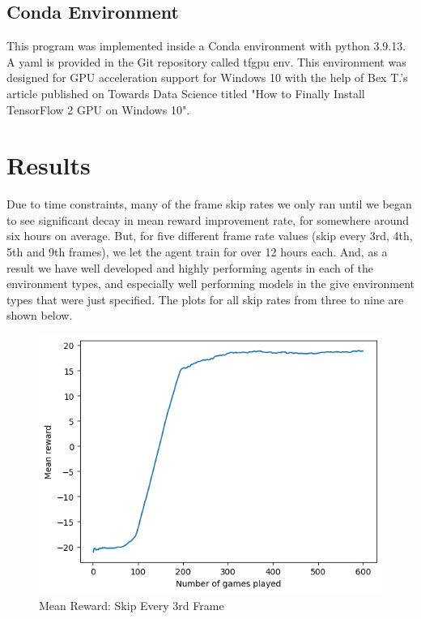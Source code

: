 \documentclass[12pt, a4paper, twocolumn]{article} %
\begin{document}
\subsection{Conda Environment}

This program was implemented inside a Conda environment with python 3.9.13. A yaml is provided in the Git repository called tfgpu env. This environment was designed for GPU acceleration support for Windows 10 with the help of Bex T.'s article published on Towards Data Science titled "How to Finally Install TensorFlow 2 GPU on Windows 10".



\section{Results}

Due to time constraints, many of the frame skip rates we only ran until we began to see significant decay in mean reward improvement rate, for somewhere around six hours on average. But, for five different frame rate values (skip every 3rd, 4th, 5th and 9th frames), we let the agent train for over 12 hours each. And, as a result we have well developed and highly performing agents in each of the environment types, and especially well performing models in the give environment types that were just specified. The plots for all skip rates from three to nine are shown below.


\begin{figure}[H]
	\includegraphics[width=\linewidth]{mr_sk3.PNG} %
	\caption{Mean Reward: Skip Every 3rd Frame} %
\end{figure}
\end{document}

